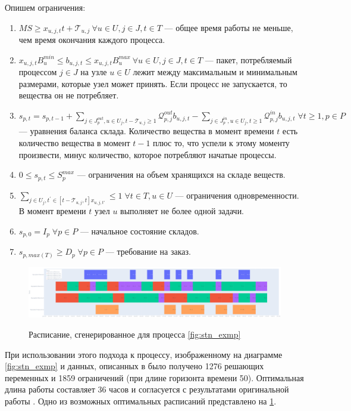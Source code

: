 \documentclass[12pt, twoside]{article}
\theoremstyle{definition}
\newcommand{\Tau}{\mathcal{T}}
\begin{document}
Опишем ограничения:

\begin{enumerate}
	\item $MS \geq x_{u, j, t}t + \Tau_{u, j} \: \forall u \in U, j \in J, t \in T$ --- общее время работы не меньше, чем время окончания каждого процесса.
	\item $x_{u, j, t}B^{min}_u \leq b_{u, j, t} \leq x_{u, j, t}B^{max}_u \: \forall u \in U, j \in J, t \in T$ --- пакет, потребляемый процессом $j \in J$ на узле $u \in U$ лежит между максимальным и минимальным размерами, которые узел может принять. Если процесс не запускается, то вещества он не потребляет.
	\item $s_{p, t} = s_{p, t-1} + \displaystyle\sum_{j \in J^{out}_p, u \in U_j, t - \Tau_{u, j} \geq 1} \mathcal{Q}^{out}_{p, j}b_{u, j, t} - \displaystyle\sum_{j \in J^{in}_p, u \in U_j, t \geq 1} \mathcal{Q}^{in}_{p, j}b_{u, j, t} \; \forall t \geq 1, p \in P$ --- уравнения баланса склада. Количество вещества в момент времени $t$ есть количество вещества в момент $t-1$ плюс то, что успели к этому моменту произвести, минус количество, которое потребляют начатые процессы.
	\item $0 \leq s_{p, t} \leq S^{max}_p$ --- ограничения на объем хранящихся на складе веществ.
	\item $\displaystyle\sum_{j \in U_j, t^{'} \in [t-\Tau_{u, j}, t] x_{u, j, t'}} \leq 1 \; \forall t \in T, u \in U$ --- ограничения одновременности. В момент времени $t$ узел $u$ выполняет не более одной задачи.
	\item $s_{p, 0} = I_p \; \forall p \in P$ --- начальное состояние складов.
	\item $s_{p, max(T)} \geq D_p \; \forall p \in P$ --- требование на заказ.
\end{enumerate}

\begin{figure}[h]
\caption{Расписание, сгенерированное для процесса \ref{fig:stn_exmp}}
\centering
\includegraphics[width=1.0\textwidth]{simpleplan}
\label{fig:simpleplan}
\end{figure}

При использовании этого подхода к процессу, изображенному на диаграмме \ref{fig:stn_exmp} и данных, описанных в \cite{discretetime} было получено 1276 решающих переменных и 1859 ограничений (при длине горизонта времени 50). Оптимальная длина работы составляет 36 часов и согласуется с результатами оригинальной работы \cite{discretetime}. Одно из возможных оптимальных расписаний представлено на \ref{fig:simpleplan}.
\end{document}
